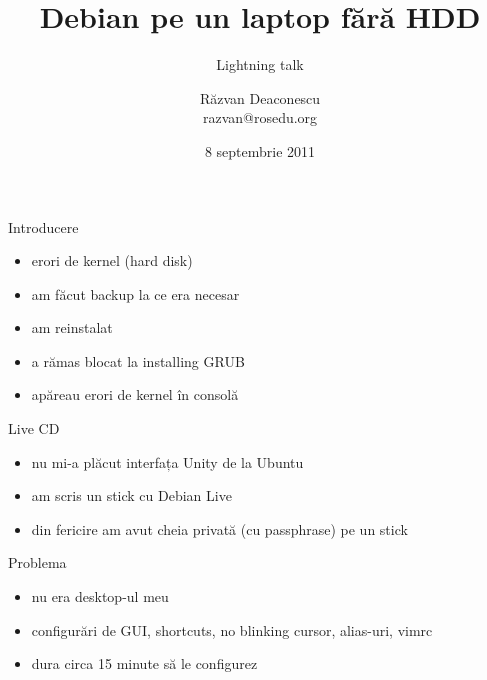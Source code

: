 \documentclass{simple}
\title[No HDD Debian]{Debian pe un laptop fără HDD}
\subtitle{Lightning talk}
\institute{Întâlnirile lunare RLUG -- Septembrie 2011}
\author[Răzvan Deaconescu]{Răzvan Deaconescu\\
      razvan@rosedu.org}
\date{8 septembrie 2011}
\begin{document}
\frame{\titlepage}

\begin{frame}{Introducere}
  \begin{itemize}     %
    \item erori de kernel (hard disk)
    \item am făcut backup la ce era necesar
    \item am reinstalat
    \item a rămas blocat la installing GRUB
    \item apăreau erori de kernel în consolă
  \end{itemize}
\end{frame}

\begin{frame}{Live CD}
  \begin{itemize}
    \item nu mi-a plăcut interfața Unity de la Ubuntu
    \item am scris un stick cu Debian Live
    \item din fericire am avut cheia privată (cu passphrase) pe un stick
  \end{itemize}
\end{frame}

\begin{frame}{Problema}
  \begin{itemize}
    \item nu era desktop-ul meu
    \item configurări de GUI, shortcuts, no blinking cursor, alias-uri, vimrc
    \item dura circa 15 minute să le configurez
  \end{itemize}
\end{frame}
\end{document}
